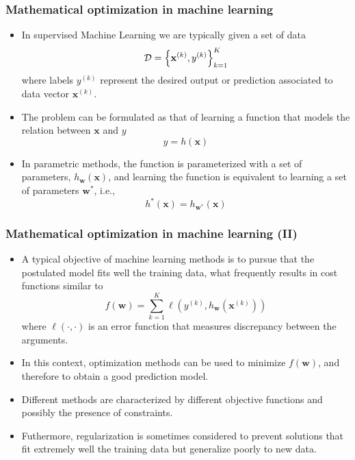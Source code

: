 \documentclass{beamer}
\newcommand{\xM}{{\mathbf x}}
\newcommand{\w}{{\mathbf w}}
\begin{document}
\begin{frame}

	\frametitle{Mathematical optimization in machine learning}
\begin{itemize}
\item In supervised Machine Learning we are typically given a set of data
$${\cal D} = \left\{{\xM^{(k)}, y^{(k)}}\right\}_{k=1}^K$$
where labels $y^{(k)}$ represent the desired output or prediction associated to data vector $\xM^{(k)}$.

\item The problem can be formulated as that of learning a function that models the relation between $\xM$ and $y$
$$y = h(\xM)$$

\item In parametric methods, the function is parameterized with a set of parameters, $h_\w(\xM)$, and learning the function is equivalent to learning a set of parameters $\w^\ast$, i.e.,
$$h^\ast (\xM) = h_{\w^\ast}(\xM)$$



\end{itemize}

\end{frame}

\begin{frame}

	\frametitle{Mathematical optimization in machine learning (II)}
\begin{itemize}
\item A typical objective of machine learning methods is to pursue that the postulated model fits well the training data, what frequently results in cost functions similar to
$$f(\w) = \sum_{k=1}^K \ell(y^{(k)}, h_\w(\xM^{(k)}))$$
where $\ell(\cdot, \cdot)$ is an error function that measures discrepancy between the arguments. 

\item In this context, optimization methods can be used to minimize $f(\w)$, and therefore to obtain a good prediction model.

\item Different methods are characterized by different objective functions and possibly the presence of constraints.

\item Futhermore, regularization is sometimes considered to prevent solutions that fit extremely well the training data but generalize poorly to new data.

\end{itemize}

\end{frame}
\end{document}
